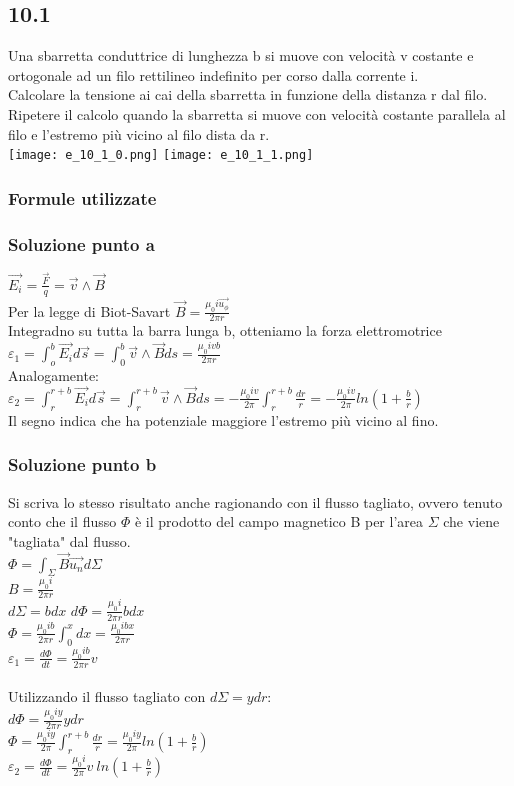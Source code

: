 \documentclass[../../main.tex]{subfiles}
\begin{document}
\subsection*{10.1}
Una sbarretta conduttrice di lunghezza b si muove con velocità v costante e ortogonale ad un filo rettilineo indefinito per corso dalla corrente i.\\
Calcolare la tensione ai cai della sbarretta in funzione della distanza r dal filo.\\
Ripetere il calcolo quando la sbarretta si muove con velocità costante parallela al filo e l'estremo più vicino al filo dista da r.\\
\texttt{[image: e\_10\_1\_0.png]}
\texttt{[image: e\_10\_1\_1.png]}
\subsubsection*{Formule utilizzate}
\subsubsection*{Soluzione punto a}
$\vec{E_i} = \frac{\vec{F}}{q} = \vec{v}\wedge\vec{B}$\\
Per la legge di Biot-Savart $\vec{B} = \frac{\mu_0i\vec{u_\phi}}{2\pi r}$\\
Integradno su tutta la barra lunga b, otteniamo la forza elettromotrice $\varepsilon_1 = \int_o^b\vec{E_i}d\vec{s} = \int_0^b\vec{v}\wedge\vec{B} ds = \frac{\mu_0ivb}{2\pi r}$\\
Analogamente: $\varepsilon_2 = \int_r^{r+b} \vec{E_i} d\vec{s} = \int_r^{r+b}\vec{v}\wedge\vec{B} ds= -\frac{\mu_0 iv}{2\pi}\int_r^{r+b}\frac{dr}{r} = -\frac{\mu_0 iv}{2\pi}ln\left(1+\frac{b}{r}\right)$\\
Il segno indica che ha potenziale maggiore l'estremo più vicino al fino.\\
\subsubsection*{Soluzione punto b}
Si scriva lo stesso risultato anche ragionando con il flusso tagliato, ovvero tenuto conto che il flusso $\Phi$ è il prodotto del campo magnetico B per l'area $\Sigma$ che viene "tagliata" dal flusso.\\
$\Phi = \int_\Sigma\vec{B}\vec{u_n}d\Sigma$\\
$B = \frac{\mu_0i}{2\pi r}$\\
$d\Sigma = bdx$
\tab $d\Phi = \frac{\mu_0i}{2\pi r}bdx$\\
$\Phi = \frac{\mu_0 ib}{2\pi r}\int_0^xdx = \frac{\mu_0 ibx}{2\pi r}$\\
$\varepsilon_1 = \frac{d\Phi}{dt} = \frac{\mu_0 ib}{2\pi r}v$\\\\
Utilizzando il flusso tagliato con $d\Sigma = ydr$:\\
$d\Phi = \frac{\mu_0iy}{2\pi r}ydr$\\
$\Phi = \frac{\mu_0 iy}{2\pi}\int_r^{r+b}\frac{dr}{r} = \frac{\mu_0 iy}{2\pi}ln\left(1+\frac{b}{r}\right)$\\
$\varepsilon_2 = \frac{d\Phi}{dt} = \frac{\mu_0i}{2\pi}v\ ln\left(1+\frac{b}{r}\right)$
\newpage
\end{document}
